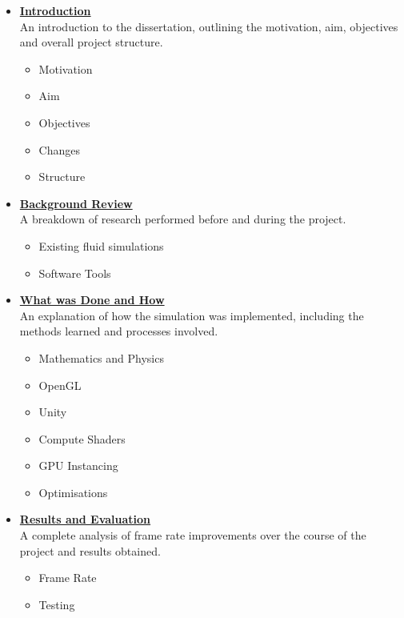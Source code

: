 \documentclass[12pt]{article}
\begin{document}
    \begin{itemize}
        \item \hyperref[sec:introduction]{\textbf{Introduction}} \\
        An introduction to the dissertation, outlining the motivation, aim, objectives and overall project structure. 
        \begin{itemize}
            \item Motivation
            \item Aim
            \item Objectives
            \item Changes
            \item Structure
        \end{itemize}
        \item \hyperref[sec:backgroundreview]{\textbf{Background Review}} \\
        A breakdown of research performed before and during the project.
        \begin{itemize}
            \item Existing fluid simulations
            \item Software Tools
        \end{itemize}
        \item \hyperref[sec:whatwasdoneandhow]{\textbf{What was Done and How}} \\
        An explanation of how the simulation was implemented, including the methods learned and processes involved.
        \begin{itemize}
            \item Mathematics and Physics
            \item OpenGL
            \item Unity
            \item Compute Shaders
            \item GPU Instancing
            \item Optimisations
        \end{itemize}
        \item \hyperref[sec:resultsandevaluation]{\textbf{Results and Evaluation}} \\
        A complete analysis of frame rate improvements over the course of the project and results obtained.
        \begin{itemize}
            \item Frame Rate
            \item Testing

\end{itemize}
\end{itemize}
\end{document}
